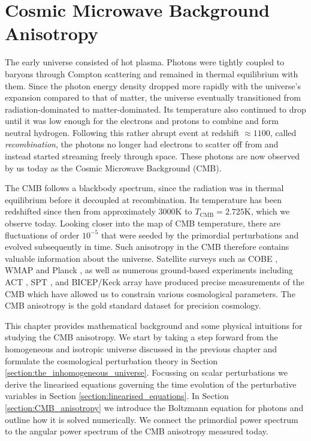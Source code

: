
\chapter{Cosmic Microwave Background Anisotropy}

\ifpdf
    \graphicspath{{Chapter2/Figs/Raster/}{Chapter2/Figs/PDF/}{Chapter2/Figs/}}
\else
    \graphicspath{{Chapter2/Figs/Vector/}{Chapter2/Figs/}}
\fi

The early universe consisted of hot plasma. Photons were tightly coupled to baryons through Compton scattering and remained in thermal equilibrium with them. Since the photon energy density dropped more rapidly with the universe's expansion compared to that of matter, the universe eventually transitioned from radiation-dominated to matter-dominated. Its temperature also continued to drop until it was low enough for the electrons and protons to combine and form neutral hydrogen. Following this rather abrupt event at redshift $\approx1100$, called \textit{recombination}, the photons no longer had electrons to scatter off from and instead started streaming freely through space. These photons are now observed by us today as the Cosmic Microwave Background (CMB).

The CMB follows a blackbody spectrum, since the radiation was in thermal equilibrium before it decoupled at recombination. Its temperature has been redshifted since then from approximately $3000$K to $T_\text{CMB}=2.725$K, which we observe today. Looking closer into the map of CMB temperature, there are fluctuations of order $10^{-5}$ that were seeded by the primordial perturbations and evolved subsequently in time. Such anisotropy in the CMB therefore contains valuable information about the universe.  Satellite surveys such as COBE \cite{Smoot1992cobe}, WMAP \cite{Spergel2003wmapfirst} and Planck \cite{PlanckCollaboration2013paramters}, as well as numerous ground-based experiments including ACT \cite{Dunkley2011act}, SPT \cite{Carlstrom2011spt}, and BICEP/Keck array \cite{Ade2016bicepkeck} have produced precise measurements of the CMB which have allowed us to constrain various cosmological parameters. The CMB anisotropy is the gold standard dataset for precision cosmology.

This chapter provides mathematical background and some physical intuitions for studying the CMB anisotropy. We start by taking a step forward from the homogeneous and isotropic universe discussed in the previous chapter and formulate the cosmological perturbation theory in Section \ref{section:the_inhomogeneous_universe}. Focussing on scalar perturbations we derive the linearised equations governing the time evolution of the perturbative variables in Section \ref{section:linearised_equations}. In Section \ref{section:CMB_anisotropy} we introduce the Boltzmann equation for photons and outline how it is solved numerically. We connect the primordial power spectrum to the angular power spectrum of the CMB anisotropy measured today.


